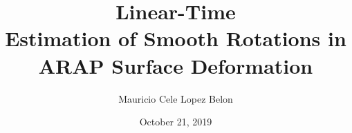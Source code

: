 \documentclass{birkjour}
\numberwithin{equation}{section}
\begin{document}
%
%
%
%
%
%
%
%
%


\title[Linear-Time Estimation of Smooth Rotations in ARAP Surface Deformation]
 {Linear-Time \\Estimation of Smooth Rotations in \\ARAP Surface Deformation}

\author[Mauricio Cele Lopez Belon]{Mauricio Cele Lopez Belon}
\address{Madrid, Spain}



\date{October 21, 2019}
\end{document}
